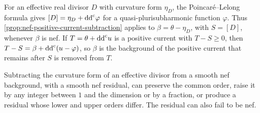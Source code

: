 For an effective real divisor $D$ with curvature form $\eta_D$, the Poincar\'e--Lelong formula gives $[D]=\eta_D+\mathrm{dd}^{\mathrm{c}}\varphi$ for a quasi-plurisubharmonic function $\varphi$. Thus \cref{prop:nef-positive-current-subtraction} applies to $\beta=\theta-\eta_D$, with $S=[D]$, whenever $\beta$ is nef. If $T=\theta+\mathrm{dd}^{\mathrm{c}} u$ is a positive current with $T-S\geq0$, then $T-S=\beta+\mathrm{dd}^{\mathrm{c}}(u-\varphi)$, so $\beta$ is the background of the positive current that remains after $S$ is removed from $T$.

\begin{proposition}\label{prop:nef-specified-residual-examples}
Subtracting the curvature form of an effective divisor from a smooth nef background, with a smooth nef residual, can preserve the common order, raise it by any integer between $1$ and the dimension or by a fraction, or produce a residual whose lower and upper orders differ. The residual can also fail to be nef.
\end{proposition}

